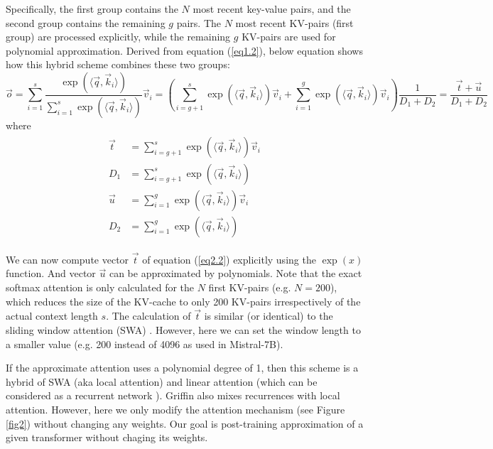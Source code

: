 \documentclass{article}
\numberwithin{equation}{section} %
\newcommand{\dpro}[1]{\langle #1 \rangle}  %
\def\q{\vec{q}}
\def\k{\vec{k}}
\def\v{\vec{v}}
\def\o{\vec{o}}
\def\t{\vec{t}}
\def\u{\vec{u}}
\def\dotqk{\dpro{\q, \k_i}}  %
\def\edotqk{\exp(\dotqk)}    %
\begin{document}
Specifically, the first group contains the $N$ most recent key-value pairs, and the second group contains the remaining $g$ pairs. The $N$ most recent KV-pairs (first group) are processed explicitly, while the remaining $g$ KV-pairs are used for polynomial approximation. Derived from equation (\ref{eq1.2}), below equation shows how this hybrid scheme combines these two groups:
\begin{equation}
  \o = \sum_{i = 1}^s \frac{\edotqk}{\sum_{i = 1}^s \edotqk} \v_i
     = \left(\sum_{i=g+1}^s \edotqk \v_i + \sum_{i=1}^g \edotqk \v_i \right)
       \frac{1}{D_1 + D_2} = \frac{\t + \u}{D_1 + D_2}
\label{eq2.1} \end{equation}
where
\begin{align} \begin{split}
  \t  &= \sum_{i=g+1}^s \edotqk \v_i \\
  D_1 &= \sum_{i=g+1}^s \edotqk \\
  \u  &= \sum_{i=1}^g   \edotqk \v_i \\
  D_2 &= \sum_{i=1}^g   \edotqk
\label{eq2.2} \end{split} \end{align}

We can now compute vector $\t$ of equation (\ref{eq2.2}) explicitly using the $\exp(x)$ function. And vector $\u$ can be approximated by polynomials. Note that the exact softmax attention is only calculated for the $N$ first KV-pairs (e.g. $N = 200$), which reduces the size of the KV-cache to only  200 KV-pairs irrespectively of the actual context length $s$. The calculation of $\t$ is similar (or identical) to the sliding window attention (SWA) \citep{longformer}. However, here we can set the window length to a smaller value (e.g. 200 instead of 4096 as used in Mistral-7B).

If the approximate attention uses a polynomial degree of 1, then this scheme is a hybrid of SWA (aka local attention) and linear attention \citep{linear} (which can be considered as a recurrent network \citep{linear}). Griffin \citep{griffin} also mixes recurrences with local attention. However, here we only modify the attention mechanism (see Figure \ref{fig2}) without changing any weights. Our goal is post-training approximation of a given transformer without chaging its weights.
\end{document}
